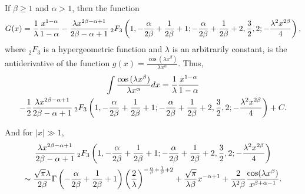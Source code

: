 \documentclass[smallextended]{svjour3}
\begin{document}
\begin{theorem}
If $\beta\ge1$ and $\alpha >1$, then the function
$$G(x)=\frac{1}{\lambda}\frac{x^{1-\alpha}}{1-\alpha}-\frac{\lambda x^{2\beta-\alpha+1}}{2\beta-\alpha+1}\hspace{.075cm} _{2}F_{3}\left(1,-\frac{\alpha}{2\beta}+\frac{1}{2\beta}+1;-\frac{\alpha}{2\beta}+\frac{1}{2\beta}+2,\frac{3}{2},2;-\frac{\lambda^2 x^{2\beta}}{4}\right),$$
where ${}_2F_3$ is a hypergeometric function \cite{AS} and $\lambda$ is an arbitrarily constant, is the antiderivative of the function $g(x)=\frac{\cos{(\lambda x^\beta)
}}{\lambda x^\alpha}$. Thus,
\begin{multline}
\int\frac{\cos{(\lambda x^\beta)}}{\lambda x^\alpha}dx=\frac{1}{\lambda}\frac{x^{1-\alpha}}{1-\alpha}\\-\frac{1}{2}\frac{\lambda x^{2\beta-\alpha+1}}{2\beta-\alpha+1}\hspace{.075cm} _{2}F_{3}\left(1,-\frac{\alpha}{2\beta}+\frac{1}{2\beta}+1;-\frac{\alpha}{2\beta}+\frac{1}{2\beta}+2,\frac{3}{2},2;-\frac{\lambda^2 x^{2\beta}}{4}\right)+C.
\label{Thm4-1}
\end{multline}

And for $|x|\gg1$,
\begin{multline}
\frac{\lambda x^{2\beta-\alpha+1}}{2\beta-\alpha+1}\hspace{.075cm} _{2}F_{3}\left(1,-\frac{\alpha}{2\beta}+\frac{1}{2\beta}+1;-\frac{\alpha}{2\beta}+\frac{1}{2\beta}+2,\frac{3}{2},2;-\frac{\lambda^2 x^{2\beta}}{4}\right)\\\sim
\frac{\sqrt{\pi}\lambda}{2\beta}\Gamma\left(-\frac{\alpha}{2\beta}+\frac{1}{2\beta}+1\right)\left(\frac{2}{\lambda }\right)^{-\frac{\alpha}{\beta}+\frac{1}{\beta}+2}+\frac{\sqrt{\pi}}{\lambda\beta}x^{-\alpha+1}
+\frac{2}{\lambda^2\beta}\frac{\cos(\lambda x^{\beta})}{x^{\beta+\alpha-1}}.\\
\label{Thm4-2}
\end{multline}
\label{Thm4}
\end{theorem}
\end{document}
